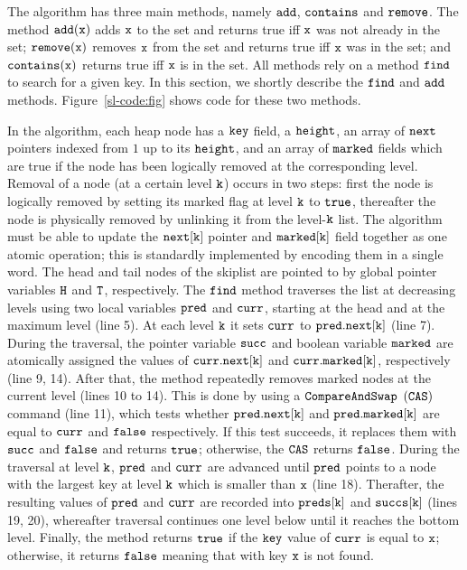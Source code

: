 The algorithm has three main methods, namely $\tt add$, $\tt contains$ and $\tt remove$. The method $\tt add(x)$ adds $\tt x$ to the set and returns true iff $\tt x$ was not already in the set; $\tt remove(x)$ removes $\tt x$ from the set and returns true iff ${\tt x}$ was in the set; and $\tt contains(x)$
returns true iff $\tt x$ is in the set.
All methods rely on a method $\tt find$ to search for a given key. 
In this section, we shortly describe the $\tt find$ and $\tt add$ methods.
Figure~\ref{sl-code:fig} shows code for these two methods.
\vspace*{-0.6cm}




\vspace*{-0.6cm}

In the algorithm, each heap node has a $\tt key$ field, a $\tt height$, an array of $\tt next$ pointers indexed from
$1$ up to its $\tt height$, and an array of $\tt marked$ fields which are true if the node has been logically removed at the corresponding level. Removal of a node (at a certain level ${\tt k}$) occurs in two steps: first the node is logically removed by setting its marked flag at level ${\tt k}$ to $\tt true$, thereafter the node is physically removed by unlinking it from the level-${\tt k}$ list. The algorithm must be able to update the $\tt next[k]$ pointer and $\tt marked[k]$ field together as one atomic operation; this is standardly implemented by encoding them in a single word. The head and tail nodes of the skiplist are pointed to by global pointer variables $\tt H$ and $\tt T$, respectively. The $\tt find$ method traverses the list at decreasing levels using two local variables $\tt pred$ and $\tt curr$, starting at the head and at 
the maximum level (line 5). At each level $\tt k$ it sets $\tt curr$ to $\tt pred.next[k]$ (line 7). During the traversal, the pointer variable $\tt succ$ and boolean variable $\tt marked$ are atomically assigned the values of $\tt curr.next[k]$ and $\tt curr.marked[k]$, respectively (line 9, 14). After that, the method repeatedly removes marked nodes at the current level (lines 10 to 14). This is done by using a $\tt CompareAndSwap$ $\tt (CAS)$ command (line 11), which tests whether $\tt pred.next[k]$ and $\tt pred.marked[k]$ are equal to $\tt curr$ and $\tt false$ respectively. If this test succeeds, it replaces them with $\tt succ$ and $\tt false$ and returns $\tt true$; otherwise, the $\tt CAS$ returns $\tt false$. During the traversal at level $\tt k$, $\tt pred$ and $\tt curr$ are advanced until $\tt pred$ points to a node with the largest key at level $\tt k$ which is smaller than $\tt x$ (line 18). Therafter, the resulting values of $\tt pred$ and $\tt curr$ are recorded into $\tt preds[k]$ and $\tt succs[k]$ (lines 19, 20), whereafter traversal continues one level below until it reaches the bottom level. Finally, the
method returns $\tt true$ if the $\tt key$ value of $\tt curr$ is equal to $\tt x$; otherwise, it returns $\tt false$ meaning that with key $\tt x$ is not found.



